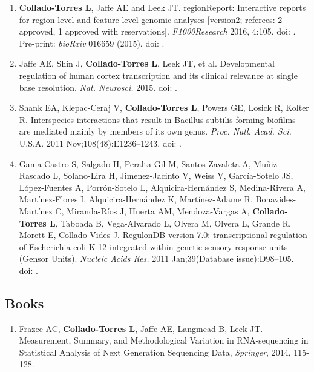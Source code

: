 \begin{enumerate}
        \item \textbf{Collado-Torres L}, Jaffe AE and Leek JT. regionReport: Interactive reports for region-level and feature-level genomic analyses [version2; referees: 2 approved, 1 approved with reservations]. \emph{F1000Research} 2016, 4:105. doi: .
        \\ Pre-print: \emph{bioRxiv} 016659 (2015). doi: .
        
        \item Jaffe AE, Shin J, \textbf{Collado-Torres L}, Leek JT, et al. Developmental regulation of human cortex transcription and its clinical relevance at single base resolution. \emph{Nat. Neurosci.} 2015. doi: .
        
        \item Shank EA, Klepac-Ceraj V, \textbf{Collado-Torres L}, Powers GE, Losick R, Kolter R. Interspecies interactions that result in Bacillus subtilis forming biofilms are mediated mainly by members of its own genus. \emph{Proc. Natl. Acad. Sci.} U.S.A. 2011 Nov;108(48):E1236–1243. doi: .
        
        \item Gama-Castro S, Salgado H, Peralta-Gil M, Santos-Zavaleta A, Muñiz-Rascado L, Solano-Lira H, Jimenez-Jacinto V, Weiss V, Garc\'ia-Sotelo JS, L\'opez-Fuentes A, Porr\'on-Sotelo L, Alquicira-Hern\'andez S, Medina-Rivera A, Mart\'inez-Flores I, Alquicira-Hern\'andez K, Mart\'inez-Adame R, Bonavides-Mart\'inez C, Miranda-R\'ios J, Huerta AM, Mendoza-Vargas A, \textbf{Collado-Torres L}, Taboada B, Vega-Alvarado L, Olvera M, Olvera L, Grande R, Morett E, Collado-Vides J. RegulonDB version 7.0: transcriptional regulation of Escherichia coli K-12 integrated within genetic sensory response units (Gensor Units). \emph{Nucleic Acids Res.} 2011 Jan;39(Database issue):D98–105. doi: .
    \end{enumerate}
\subsection{Books}
    \begin{enumerate}
        \item Frazee AC, \textbf{Collado-Torres L}, Jaffe AE, Langmead B, Leek JT. Measurement, Summary, and Methodological Variation in RNA-sequencing in Statistical Analysis of Next Generation Sequencing Data, \emph{Springer}, 2014, 115-128.
    \end{enumerate}

